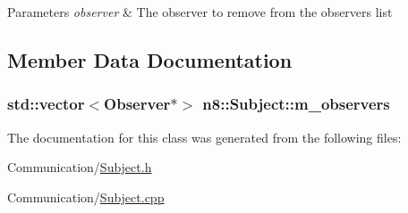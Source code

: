 \begin{DoxyParams}{Parameters}
{\em observer} & The observer to remove from the observers list \\
\hline
\end{DoxyParams}


\subsection{Member Data Documentation}
\hypertarget{classn8_1_1_subject_adaf1d665557715d9d22826c59f5fa496}{
\subsubsection[{m\-\_\-observers}]{\setlength{\rightskip}{0pt plus 5cm}std\-::vector$<${\bf Observer}$\ast$$>$ n8\-::\-Subject\-::m\-\_\-observers\hspace{0.3cm}{\ttfamily [private]}}}\label{classn8_1_1_subject_adaf1d665557715d9d22826c59f5fa496}


The documentation for this class was generated from the following files\-:\begin{DoxyCompactItemize}
\item 
Communication/\hyperlink{_subject_8h}{Subject.\-h}\item 
Communication/\hyperlink{_subject_8cpp}{Subject.\-cpp}\end{DoxyCompactItemize}
